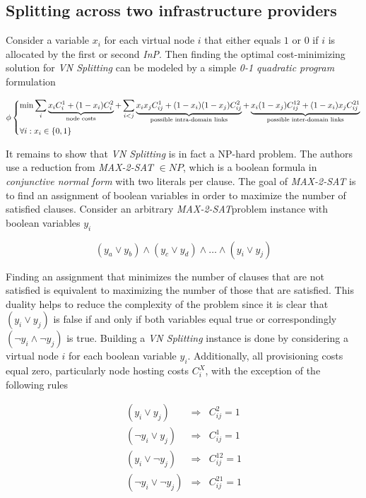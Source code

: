 \documentclass[prodmode,acmtomccap]{acmlarge}
\begin{document}
\subsection{Splitting across two infrastructure providers}
Consider a variable $x_i$ for each virtual node $i$ that either equals $1$ or $0$ if $i$ is allocated by the first or second \emph{InP}. Then finding the optimal cost-minimizing solution for
\emph{VN Splitting} can be modeled by a simple \emph{0-1 quadratic program} formulation

\[
 \phi
   \begin{dcases}
		\min \sum\limits_{i} \underbrace{x_i C_i^1 + (1-x_i) C_i^2 }_{\text{node costs}}
			+ \sum\limits_{i < j} \underbrace{x_i x_j C_{ij}^{1} + (1 - x_i)(1 - x_j) C_{ij}^{2}}_{\text{possible intra-domain links}}
			+ \underbrace{x_i (1 - x_j) C_{ij}^{12} + (1 - x_i)x_j C_{ij}^{21}}_{\text{possible inter-domain links}} \\
		\forall i : x_i \in \{ 0,1\}
   \end{dcases}
\]

It remains to show that \emph{VN Splitting} is in fact a NP-hard problem. The authors use a reduction from \emph{MAX-2-SAT} $\in NP$, which is a boolean formula in \emph{conjunctive normal form}
with two literals per clause. The goal of \emph{MAX-2-SAT} is to find an assignment of boolean variables in order to maximize the number of satisfied clauses. Consider an arbitrary 
\emph{MAX-2-SAT}problem instance with boolean variables $y_i$

$$
(y_a \vee y_b) \wedge (y_c \vee y_d) \wedge \dots \wedge (y_i \vee y_j)
$$

Finding an assignment that minimizes the number of clauses that are not satisfied is equivalent to maximizing the number of those that are satisfied. This duality helps to reduce the complexity of the problem
since it is clear that $(y_i \vee y_j)$ is false if and only if both variables equal true or correspondingly $(\lnot y_i \wedge \lnot y_j)$ is true.
Building a \emph{VN Splitting} instance is done by considering a virtual node $i$ for each boolean variable $y_i$. Additionally, all provisioning costs equal zero, particularly node hosting costs $C_i^{X}$,
with the exception of the following rules

$$
\begin{array}{ccr}
	(y_i \vee y_j) & \Rightarrow & C_{ij}^2 = 1 \\
	(\lnot y_i \vee y_j) & \Rightarrow & C_{ij}^1 = 1 \\
	(y_i \vee \lnot y_j) & \Rightarrow & C_{ij}^{12} = 1 \\
	(\lnot y_i \vee \lnot y_j) & \Rightarrow & C_{ij}^{21} = 1
\end{array}
$$
\end{document}
